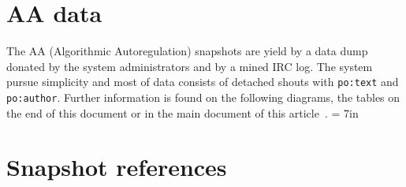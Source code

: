 \documentclass[review]{elsarticle}
\newcommand{\textttt}[1] {\texttt{\footnotesize#1}}
\begin{document}

\section{AA data}
The AA (Algorithmic Autoregulation) snapshots are yield by a data dump donated by the system
administrators and by a mined IRC log.
The system pursue simplicity and most of data consists of detached
shouts with \textttt{po:text} and \textttt{po:author}.
Further information is found on the following diagrams, the tables on
the end of this document or in the main document of this
article~\cite{losd}.
\textheight = 7in
\pdfpageheight \foobar
{}

\section{Snapshot references}
\label{sreferences}
\pdfpageheight 10in

\end{document}
